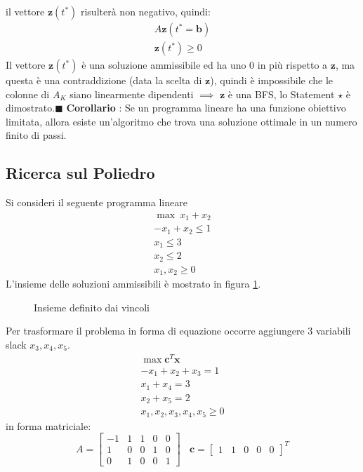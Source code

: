 \documentclass[10pt, letterpaper]{report}
\begin{document}
il vettore $\mathbf z(t^*)$ risulterà non negativo, quindi: 
$$\begin{matrix}
    A\mathbf z(t^*=\mathbf b)\\ \mathbf z(t^*)\ge 0
\end{matrix}$$
Il vettore $\mathbf z(t^*)$ è una soluzione ammissibile ed ha uno 0 in più rispetto a $\mathbf z$, ma questa è una contraddizione (data la scelta di $\mathbf z$), quindi è impossibile che le colonne di $A_K$ siano linearmente dipendenti $\implies$ $\mathbf z$ è una BFS, lo Statement $\star$ è dimostrato.\hfill$\blacksquare$\acc 
\textbf{Corollario} : Se un programma lineare ha una funzione obiettivo limitata, allora esiste un'algoritmo che trova una soluzione ottimale in un numero finito di passi.
\subsection{Ricerca sul Poliedro}\label{RicercasulPoliedro} 
Si consideri il seguente programma lineare$$\begin{matrix}
    \max \ x_1+x_2\\ -x_1+x_2\le 1 \\ x_1\le 3 \\ x_2 \le 2 \\ x_1,x_2 \ge 0
\end{matrix}$$
L'insieme delle soluzioni ammissibili è mostrato in figura \ref{fig:solEsempio}.
\begin{figure}[h]\label{fig:solEsempio}
    \caption{Insieme definito dai vincoli}
\end{figure}
Per trasformare il problema in forma di equazione occorre aggiungere 3 variabili slack $x_3,x_4,x_5$.$$\begin{matrix}
    \max \mathbf{c}^T \mathbf x  \ \\ -x_1+x_2+x_3= 1 \\ x_1+x_4= 3 \\ x_2 +x_5= 2 \\ x_1,x_2,x_3,x_4,x_5 \ge 0
\end{matrix}$$
in forma matriciale:
$$A=\begin{bmatrix}
    -1&1&1&0&0\\ 
    1&0&0&1&0 \\ 
    0& 1 & 0 & 0 & 1
\end{bmatrix}  \ \ \ \ \mathbf c = \begin{bmatrix}
    1 & 1 & 0&0&0
\end{bmatrix}^T$$
\end{document}
